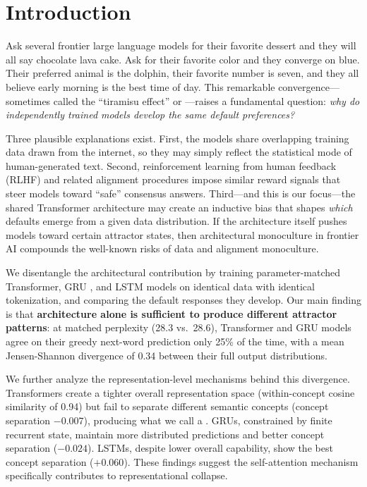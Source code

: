 \section{Introduction}
\label{sec:intro}

Ask several frontier large language models for their favorite dessert and they will all say chocolate lava cake. Ask for their favorite color and they converge on blue. Their preferred animal is the dolphin, their favorite number is seven, and they all believe early morning is the best time of day. This remarkable convergence---sometimes called the ``tiramisu effect'' or ---raises a fundamental question: \emph{why do independently trained models develop the same default preferences?}

Three plausible explanations exist. First, the models share overlapping training data drawn from the internet, so they may simply reflect the statistical mode of human-generated text. Second, reinforcement learning from human feedback (RLHF) and related alignment procedures impose similar reward signals that steer models toward ``safe'' consensus answers. Third---and this is our focus---the shared Transformer architecture \citep{vaswani2017attention} may create an inductive bias that shapes \emph{which} defaults emerge from a given data distribution. If the architecture itself pushes models toward certain attractor states, then architectural monoculture in frontier AI compounds the well-known risks of data and alignment monoculture.

We disentangle the architectural contribution by training parameter-matched Transformer, GRU \citep{cho2014gru}, and LSTM \citep{hochreiter1997lstm} models on identical data with identical tokenization, and comparing the default responses they develop. Our main finding is that \textbf{architecture alone is sufficient to produce different attractor patterns}: at matched perplexity (28.3 vs.\ 28.6), Transformer and GRU models agree on their greedy next-word prediction only 25\% of the time, with a mean Jensen-Shannon divergence of 0.34 between their full output distributions.

We further analyze the representation-level mechanisms behind this divergence. Transformers create a tighter overall representation space (within-concept cosine similarity of 0.94) but fail to separate different semantic concepts (concept separation $-0.007$), producing what we call a . GRUs, constrained by finite recurrent state, maintain more distributed predictions and better concept separation ($-0.024$). LSTMs, despite lower overall capability, show the best concept separation ($+0.060$). These findings suggest the self-attention mechanism specifically contributes to representational collapse.

